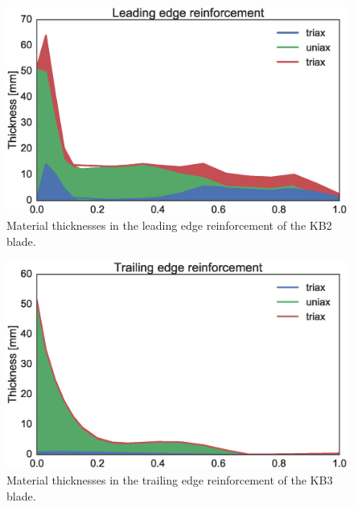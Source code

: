 \begin{figure}[!ht]
\begin{center}
	\includegraphics[width=.85\linewidth]{figures/KB2_region07.eps}
\end{center}
\caption{Material thicknesses in the leading edge reinforcement of the KB2 blade.}
\label{fig:KB2matstackr07}
\end{figure}
\begin{figure}[!ht]
\begin{center}
	\includegraphics[width=.85\linewidth]{figures/KB3_region01.eps}
\end{center}
\caption{Material thicknesses in the trailing edge reinforcement of the KB3 blade.}
\label{fig:KB3matstackr01}
\end{figure}

